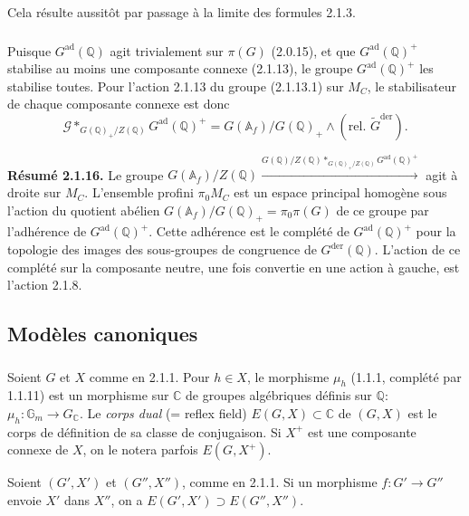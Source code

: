 \documentclass[12pt,a4paper]{article}
\theoremstyle{plain}
\theoremstyle{definition}
\theoremstyle{remark}
\newcommand{\QQ}{\mathbb{Q}}
\newcommand{\CC}{\mathbb{C}}
\newcommand{\Af}{\mathbb{A}_f}
\newcommand{\Gm}{\mathbb{G}}
\begin{document}
Cela r\'esulte aussit\^ot par passage \`a la limite des formules 2.1.3.

\subsubsection{}

Puisque $G^{\text{ad}}(\QQ)$ agit trivialement sur $\pi(G)$ (2.0.15), et que $G^{\text{ad}}(\QQ)^+$ stabilise au moins une composante connexe (2.1.13), le groupe $G^{\text{ad}}(\QQ)^+$ les stabilise toutes. Pour l'action 2.1.13 du groupe (2.1.13.1) sur $M_C$, le stabilisateur de chaque composante connexe est donc
\begin{equation}\label{eq:2.1.15.1}
\mathscr{G} *_{G(\QQ)_+/Z(\QQ)} G^{\text{ad}}(\QQ)^+ = G(\Af)/G(\QQ)_+\wedge(\text{rel.~}\tilde{G}^{\text{der}}).
\end{equation}

\textbf{R\'esum\'e 2.1.16.} Le groupe $G(\Af)/Z(\QQ) \xrightarrow{G(\QQ)/Z(\QQ) *_{G(\QQ)_+/Z(\QQ)} G^{\text{ad}}(\QQ)^+}$ agit \`a droite sur $M_C$. L'ensemble profini $\pi_0 M_C$ est un espace principal homog\`ene sous l'action du quotient ab\'elien $G(\Af)/G(\QQ)_+ = \pi_0\pi(G)$ de ce groupe par l'adh\'erence de $G^{\text{ad}}(\QQ)^+$. Cette adh\'erence est le compl\'et\'e de $G^{\text{ad}}(\QQ)^+$ pour la topologie des images des sous-groupes de congruence de $G^{\text{der}}(\QQ)$. L'action de ce compl\'et\'e sur la composante neutre, une fois convertie en une action \`a gauche, est l'action 2.1.8.

\subsection{Mod\`eles canoniques}

\subsubsection{}

Soient $G$ et $X$ comme en 2.1.1. Pour $h \in X$, le morphisme $\mu_h$ (1.1.1, compl\'et\'e par 1.1.11) est un morphisme sur $\CC$ de groupes alg\'ebriques d\'efinis sur $\QQ$: $\mu_h:\Gm_m \to G_{\CC}$. Le \textit{corps dual} (= reflex field) $E(G,X) \subset \CC$ de $(G,X)$ est le corps de d\'efinition de sa classe de conjugaison. Si $X^+$ est une composante connexe de $X$, on le notera parfois $E(G,X^+)$.

Soient $(G',X')$ et $(G'',X'')$, comme en 2.1.1. Si un morphisme $f:G' \to G''$ envoie $X'$ dans $X''$, on a $E(G',X') \supset E(G'',X'')$.
\end{document}
